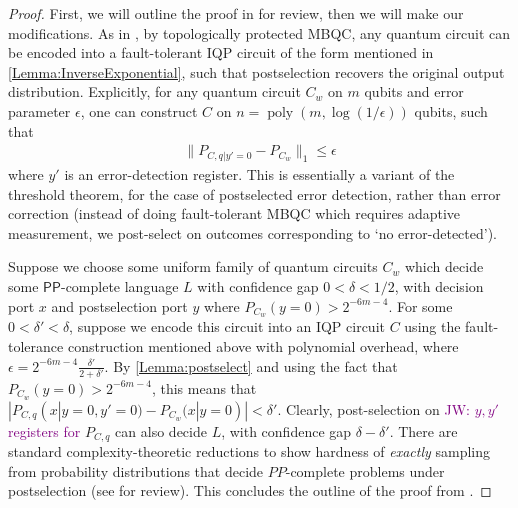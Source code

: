 \documentclass[a4paper,onecolumn,11pt,accepted=2017-05-09]{quantumarticle}
\newcommand{\PP}{\textsf{PP}}
\newcommand{\jw}[1]{\textcolor{purple}{JW: #1}}
\DeclareMathOperator{\poly}{poly}
\begin{document}
	\begin{proof}
 
		First, we will outline the proof in \cite{fujii2016computational} for review, then we will make our modifications. As in \cite{fujii2016computational}, by topologically protected MBQC, any quantum circuit can be encoded into a fault-tolerant IQP circuit of the form mentioned in \cref{Lemma:InverseExponential}, such that postselection recovers the original output distribution. 
		Explicitly, for any quantum circuit $C_w$ on $m$ qubits and error parameter $\epsilon$, one can construct $C$ on $n = \poly(m,\log (1/\epsilon))$ qubits, such that
		\begin{align}
			\|P_{C,q|y'=0} - P_{C_w}\|_{1} \leq \epsilon
		\end{align}
		where $y'$ is an error-detection register. This is essentially a variant of the threshold theorem, for the case of postselected error detection, rather than error correction (instead of doing fault-tolerant MBQC which requires adaptive measurement, we post-select on outcomes corresponding to `no error-detected'). 
		
		
		Suppose we choose some uniform family of quantum circuits $C_w$ which decide some $\PP$-complete language $L$ with confidence gap $0<\delta<1/2$, with decision port $x$ and postselection port $y$ where $P_{C_w}(y=0) > 2^{-6m-4}$. 
		For some $0 < \delta' < \delta$, suppose we encode this circuit into an IQP circuit $C$ using the fault-tolerance construction mentioned above with polynomial overhead, where $\epsilon  = 2^{-6m-4}\frac{\delta'}{2+\delta'}$. 
		By \cref{Lemma:postselect} and using the fact that $P_{C_w}(y=0) > 2^{-6m-4}$, this means that $|P_{C,q}(x|y=0,y'=0) - P_{C_w}(x|y=0)| < \delta'$. 
		Clearly, post-selection on \jw{$y,y'$ registers for} $P_{C,q}$ can also decide $L$, with confidence gap $\delta-\delta'$. 
		There are standard complexity-theoretic reductions to show hardness of \textit{exactly} sampling from probability distributions that decide $PP$-complete problems under postselection (see \cite{hangleiter2206computational} for review). 
		This concludes the outline of the proof from \cite{fujii2016computational}. 
		

\end{proof}
\end{document}
